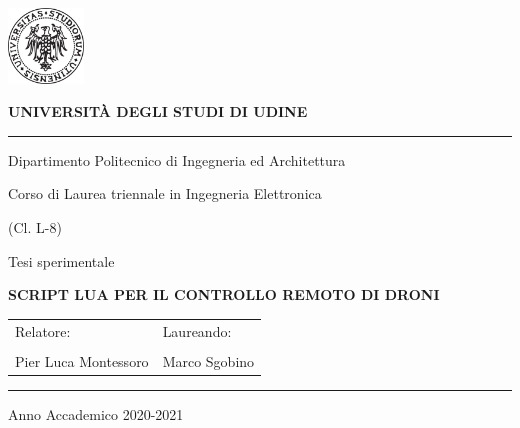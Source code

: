 \begin{titlepage}
        \begin{center}
                \begin{center}
                        \includegraphics[width=0.15\textwidth, keepaspectratio]{./logo_uniud.jpg}
                \end{center}
                \vspace*{1cm}
                \Large
                \textbf{UNIVERSITÀ DEGLI STUDI DI UDINE}
                \vspace*{1cm}

                \hrule
                \vspace*{0.6cm}

                \large
                Dipartimento Politecnico di Ingegneria ed Architettura

                Corso di Laurea triennale in Ingegneria Elettronica 

                (Cl. L-8)

                \vspace*{2.5cm}

                \large Tesi sperimentale
                \vspace*{0.8cm}

                \Large
                \textbf{SCRIPT LUA PER IL CONTROLLO REMOTO DI DRONI}

                \vfill
                
                \begin{table}[h]
                        \begin{center}
                                \begin{tabular*}{\textwidth}{@{\extracolsep{\fill}}ll}
                                        \large Relatore: & \large Laureando:  \\
                                                  &             \\
                                        \large Pier Luca Montessoro & \large Marco Sgobino
                                \end{tabular*}
                        \end{center}
                \end{table}

                \vspace*{1.2cm}
                \hrule
                \vspace*{0.6cm}
                \large
                Anno Accademico 2020-2021

        \end{center}
\end{titlepage}

